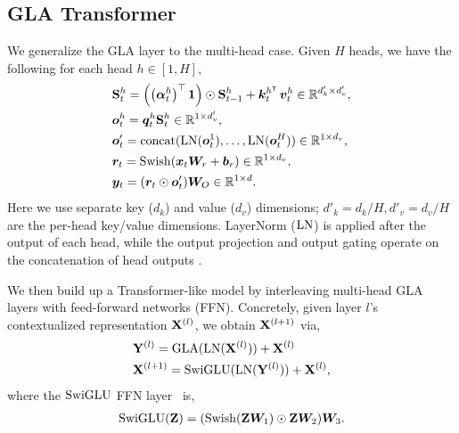 \vspace{-2mm}
\subsection{GLA Transformer}
\vspace{-2mm}
\label{sec:gla-full}
We generalize the GLA layer to the multi-head case. Given $H$ heads, we have the following for each head $h \in [1, H]$,
\begin{align*}
    &\rmS^h_{t} =  \left( \left(\balpha_{t}^h\right)^{\top} \mathbf{1} \right)
    \odot \rmS_{t-1}^h + \vk_t^{h \intercal} \, \vv^h_t   \in \mathbb{R}^{d'_k \times d'_v}, \\  %
& \vo^h_{t} = \vq_t^{h}\rmS_t^h    \in \mathbb{R}^{1 \times d'_v}, \\ &
\vo'_t = \operatorname{concat}(\lnorm(\vo^1_t), \dots, \lnorm(\vo^H_t)) \in \R^{1 \times d_v}, 
  \\
 &\vr_t = \operatorname{Swish}(\vx_t \mW_r + \vb_r)  \in \mathbb{R}^{1 \times d_v}, 
 \\ & \vy_t = (\vr_t \odot \vo'_t) \mW_{O}  \in \R^{1 \times d}. 
\end{align*}
Here we use separate key ($d_k$) and value ($d_v$) dimensions; $d'_k = d_k / H, d'_v = d_v / H$ are the per-head key/value dimensions. LayerNorm ($\operatorname{LN}$) is applied after the output of each head, while the output projection and output gating operate on the concatenation of head outputs \cite{sun2023retentive}. 

We then build up a Transformer-like model by interleaving multi-head GLA layers with feed-forward networks (FFN). Concretely, given layer $l$'s contextualized representation ${\mathbf{X}}^{(l)}$, we obtain  ${\mathbf{X}}^{(l+1)}$ via,
\begin{align*}
   &{\mathbf{Y}}^{(l)} = \operatorname{GLA}(\operatorname{LN}({\mathbf{X}}^{(l)})) + {\mathbf{X}}^{(l)} \\ 
   & {\mathbf{X}}^{(l+1)} = \operatorname{SwiGLU}(\operatorname{LN}({\mathbf{Y}}^{(l)})) + {\mathbf{X}}^{(l)},
\end{align*}
where the $\text{SwiGLU}$ FFN layer~\citep{touvron2023llama} is,
\begin{align*}
    \operatorname{SwiGLU}({\mathbf{Z}}) = (\operatorname{Swish}({\mathbf{Z}} {\bm{W}}_1) \odot {\mathbf{Z}} {\bm{W}}_2) {\bm{W}}_{3}.
\end{align*}



\vspace{-2mm}
